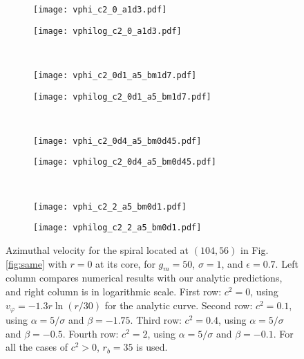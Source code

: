 \documentclass[preprint,prx,floatfix]{revtex4-1}
\begin{document}
\begin{figure}[htp]
	\centering
    \begin{subfigure}[b]{0.28\textwidth}
    \texttt{[image: vphi\_c2\_0\_a1d3.pdf]}
    \end{subfigure}
    \begin{subfigure}[b]{0.28\textwidth}
    \texttt{[image: vphilog\_c2\_0\_a1d3.pdf]}
    \end{subfigure} \\
    \begin{subfigure}[b]{0.28\textwidth}
    \texttt{[image: vphi\_c2\_0d1\_a5\_bm1d7.pdf]}
    \end{subfigure}
    \begin{subfigure}[b]{0.28\textwidth}
    \texttt{[image: vphilog\_c2\_0d1\_a5\_bm1d7.pdf]}
    \end{subfigure} \\
    \begin{subfigure}[b]{0.28\textwidth}
    \texttt{[image: vphi\_c2\_0d4\_a5\_bm0d45.pdf]}
    \end{subfigure}
    \begin{subfigure}[b]{0.28\textwidth}
    \texttt{[image: vphilog\_c2\_0d4\_a5\_bm0d45.pdf]}
    \end{subfigure} \\
    \begin{subfigure}[b]{0.28\textwidth}
    \texttt{[image: vphi\_c2\_2\_a5\_bm0d1.pdf]}
    \end{subfigure}
    \begin{subfigure}[b]{0.28\textwidth}
    \texttt{[image: vphilog\_c2\_2\_a5\_bm0d1.pdf]}
    \end{subfigure}
    \caption{Azimuthal velocity for the spiral located at $(104,56)$ in Fig. \ref{fig:same} with $r=0$ at its core, for $g_m = 50$, $\sigma = 1$, and $\epsilon = 0.7$. Left column compares numerical results with our analytic predictions, and right column is in logarithmic scale. First row: $c^2 = 0$, using $v_\varphi = -1.3r\ln(r/30)$ for the analytic curve. Second row: $c^2 = 0.1$, using $\alpha = 5/\sigma$ and $\beta = -1.75$. Third row: $c^2=0.4$, using $\alpha = 5/\sigma$ and $\beta = -0.5$. Fourth row: $c^2=2$, using $\alpha = 5/\sigma$ and $\beta = -0.1$. For all the cases of $c^2 > 0$, $r_b = 35$ is used.}
	\label{fig:vphi}
\end{figure}
\end{document}
